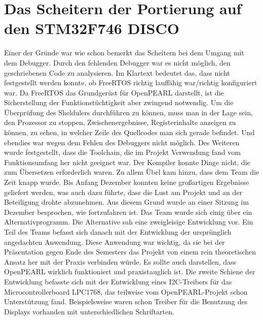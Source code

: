 \documentclass[12pt,a4paper]{article}
\author{Jonathan Weißenberger}
\begin{document}
\section{Das Scheitern der Portierung auf den STM32F746 DISCO}
Einer der Gründe war wie schon bemerkt das Scheitern bei dem Umgang mit dem Debugger. Durch den fehlenden Debugger war es nicht möglich, den geschriebenen Code zu analysieren. Im Klartext bedeutet das, dass nicht festgestellt werden konnte, ob FreeRTOS richtig lauffähig war/richtig konfiguriert war. Da FreeRTOS das Grundgerüst für OpenPEARL darstellt, ist die Sicherstellung der Funktionstüchtigkeit aber zwingend notwendig. Um die Überprüfung des Sheldulers durchführen zu können, muss man in der Lage sein, den Prozessor zu stoppen, Zwischenergebnisse, Registerinhalte anzeigen zu können, zu sehen, in welcher Zeile des Quellcodes man sich gerade befindet. Und ebendies war wegen dem Fehlen des Debuggers nicht möglich. 
Des Weiteren wurde festgestellt, dass die Toolchain, die im Projekt Verwendung fand vom Funktionsumfang her nicht geeignet war. Der Kompiler konnte Dinge nicht, die zum Übersetzen erforderlich waren.
Zu allem Übel kam hinzu, dass dem Team die Zeit knapp wurde. Bis Anfang Dezember konnten keine großartigen Ergebnisse geliefert werden, was auch dazu führte, dass die Lust am Projekt und an der Beteiligung drohte abzunehmen. 
Aus diesem Grund wurde an einer Sitzung im Dezember besprochen, wie fortzufahren ist. Das Team wurde sich einig über ein Alternativprogramm.
Die Alternative sah eine zweigleisige Entwicklung vor. Ein Teil des Teams befasst sich danach mit der Entwicklung der ursprünglich angedachten Anwendung. Diese Anwendung war wichtig, da sie bei der Präsentation gegen Ende des Semesters das Projekt von einem rein theoretischen Ansatz her mit der Praxis verbinden würde. Es sollte auch darstellen, dass OpenPEARL wirklich funktioniert und praxistauglich ist. Die zweite Schiene der Entwicklung befasste sich mit der Entwicklung eines I2C-Treibers für das Microcontrollerboard LPC1768, das teilweise vom OpenPEARL-Projekt schon Unterstützung fand. Beispielsweise waren schon Treiber für die Benutzung des Displays vorhanden mit unterschiedlichen Schriftarten.
\end{document}
